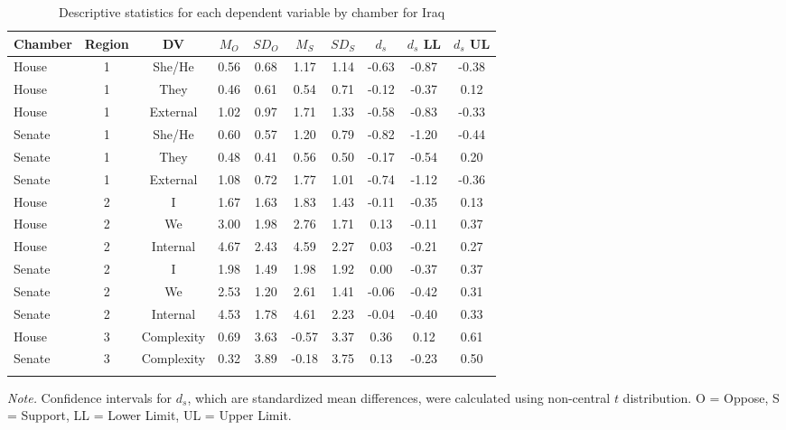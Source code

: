 \documentclass[
  english,
  ,man,floatsintext]{apa6}
\begin{document}
\begin{table}[tbp]

\begin{center}
\begin{threeparttable}

\caption{\label{tab:Itable}Descriptive statistics for each dependent variable by chamber for Iraq}

\small{

\begin{tabular}{lccccccccc}
\toprule
Chamber & Region & DV & $M_O$ & $SD_O$ & $M_S$ & $SD_S$ & $d_s$ & $d_s$ LL & $d_s$ UL\\
\midrule
House & 1 & She/He & 0.56 & 0.68 & 1.17 & 1.14 & -0.63 & -0.87 & -0.38\\
House & 1 & They & 0.46 & 0.61 & 0.54 & 0.71 & -0.12 & -0.37 & 0.12\\
House & 1 & External & 1.02 & 0.97 & 1.71 & 1.33 & -0.58 & -0.83 & -0.33\\
Senate & 1 & She/He & 0.60 & 0.57 & 1.20 & 0.79 & -0.82 & -1.20 & -0.44\\
Senate & 1 & They & 0.48 & 0.41 & 0.56 & 0.50 & -0.17 & -0.54 & 0.20\\
Senate & 1 & External & 1.08 & 0.72 & 1.77 & 1.01 & -0.74 & -1.12 & -0.36\\
House & 2 & I & 1.67 & 1.63 & 1.83 & 1.43 & -0.11 & -0.35 & 0.13\\
House & 2 & We & 3.00 & 1.98 & 2.76 & 1.71 & 0.13 & -0.11 & 0.37\\
House & 2 & Internal & 4.67 & 2.43 & 4.59 & 2.27 & 0.03 & -0.21 & 0.27\\
Senate & 2 & I & 1.98 & 1.49 & 1.98 & 1.92 & 0.00 & -0.37 & 0.37\\
Senate & 2 & We & 2.53 & 1.20 & 2.61 & 1.41 & -0.06 & -0.42 & 0.31\\
Senate & 2 & Internal & 4.53 & 1.78 & 4.61 & 2.23 & -0.04 & -0.40 & 0.33\\
House & 3 & Complexity & 0.69 & 3.63 & -0.57 & 3.37 & 0.36 & 0.12 & 0.61\\
Senate & 3 & Complexity & 0.32 & 3.89 & -0.18 & 3.75 & 0.13 & -0.23 & 0.50\\
\bottomrule
\addlinespace
\end{tabular}

}

\begin{tablenotes}[para]
\normalsize{\textit{Note.} Confidence intervals for $d_s$, which are standardized mean differences, were calculated using 
          non-central $t$ distribution. O = Oppose, S = Support, LL = Lower Limit, UL = Upper Limit.}
\end{tablenotes}

\end{threeparttable}
\end{center}

\end{table}
\end{document}
